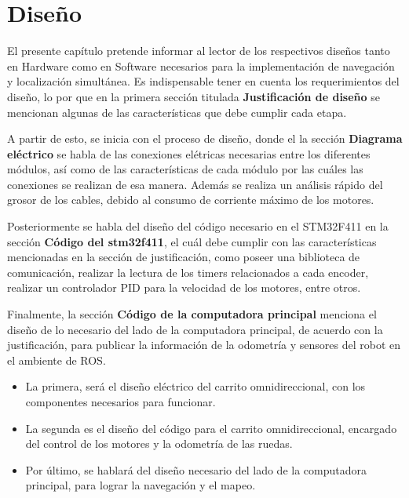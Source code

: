   \chapter{Diseño}
\label{C:diseño}

El presente capítulo pretende informar al lector de los respectivos diseños tanto en Hardware como en Software necesarios para la implementación de navegación y localización simultánea. Es indispensable tener en cuenta los requerimientos del diseño, lo por que en la primera sección titulada \textbf{Justificación de diseño} se mencionan algunas de las características que debe cumplir cada etapa.

A partir de esto, se inicia con el proceso de diseño, donde el la sección \textbf{Diagrama eléctrico} se habla de las conexiones elétricas necesarias entre los diferentes módulos, así como de las características de cada módulo por las cuáles las conexiones se realizan de esa manera. Además se realiza un análisis rápido del grosor de los cables, debido al consumo de corriente máximo de los motores.

Posteriormente se habla del diseño del código necesario en el STM32F411 en la sección \textbf{Código del stm32f411}, el cuál debe cumplir con las características mencionadas en la sección de justificación, como poseer una biblioteca de comunicación, realizar la lectura de los timers relacionados a cada encoder, realizar un controlador PID para la velocidad de los motores, entre otros.

Finalmente, la sección \textbf{Código de la computadora principal} menciona el diseño de lo necesario del lado de la computadora principal, de acuerdo con la justificación, para publicar la información de la odometría y sensores del robot en el ambiente de ROS.

\begin{itemize}
\item La primera, será el diseño eléctrico del carrito omnidireccional, con los componentes necesarios para funcionar.
\item La segunda es el diseño del código para el carrito omnidireccional, encargado del control de los motores y la odometría de las ruedas.
\item Por último, se hablará del diseño necesario del lado de la computadora principal, para lograr la navegación y el mapeo.
\end{itemize}

\newpage

